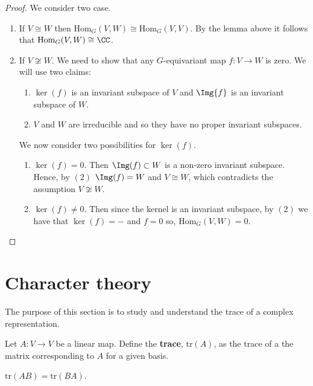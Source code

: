 \documentclass[12pt, a4paper]{article}
\begin{document}
\begin{proof}
    We consider two case.
    \begin{enumerate}
        \item If \(V \cong W\) then \(\text{Hom}_G(V,W)\cong \text{Hom}_G(V,V)\). By the lemma above it follows that \(\text{Hom}_G(V,W)\cong \CC\).
        \item If \(V \not\cong W\). We need to show that any \(G\)-equivariant map \(f:V \to W\) is zero. We will use two claims:
        \begin{enumerate}
            \item \(\ker(f)\) is an invariant subspace of \(V\) and \(\Img{f}\) is an invariant subspace of \(W\).
            \item \(V\) and \(W\) are irreducible and so they have no proper invariant subspaces.
        \end{enumerate}
        We now consider two possibilities for \(\ker(f)\).
        \begin{enumerate}
            \item \(\ker(f)=0\). Then \(\Img(f)\subset W\) is a non-zero invariant subspace. Hence, by \((2)\) \(\Img(f)=W\) and \(V\cong W\), which contradicts the assumption \(V \not\cong W\).
            \item \(\ker(f)\neq 0\). Then since the kernel is an invariant subspace, by \((2)\) we have that \(\ker(f)=-\) and \(f=0\) so, \(\text{Hom}_G(V,W)=0\).
        \end{enumerate}
    \end{enumerate}
\end{proof}

\section{Character theory}

\begin{mdnote}
    The purpose of this section is to study and understand the trace of a complex representation.
\end{mdnote}

\begin{definition}
    Let \(A:V \to V\) be a linear map. Define the \textbf{trace}, \(\text{tr}(A)\), as the trace of a the matrix corresponding to \(A\) for a given basis.
\end{definition}

\begin{mdremark}
    \(\text{tr}(AB)=\text{tr}(BA)\).
\end{mdremark}
\end{document}

